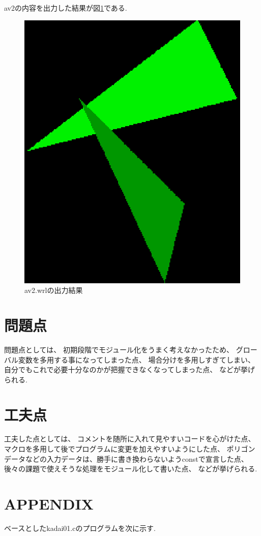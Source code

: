 \documentclass[a4j,dvipdfmx]{jsarticle}
\begin{document}
av2の内容を出力した結果が図\ref{fig:av2}である.
\begin{figure}[htbp]
  \begin{center}
        \includegraphics[clip,scale=0.7]{images/av2.eps}
        \caption{av2.wrlの出力結果}
        \label{fig:av2}
  \end{center}
\end{figure}



\section{問題点}
問題点としては、
初期段階でモジュール化をうまく考えなかったため、
グローバル変数を多用する事になってしまった点、
場合分けを多用しすぎてしまい、自分でもこれで必要十分なのかが把握できなくなってしまった点、
などが挙げられる.

\section{工夫点}
工夫した点としては、
コメントを随所に入れて見やすいコードを心がけた点、
マクロを多用して後でプログラムに変更を加えやすいようにした点、
ポリゴンデータなどの入力データは、勝手に書き換わらないようconstで宣言した点、
後々の課題で使えそうな処理をモジュール化して書いた点、
などが挙げられる.




\section{APPENDIX}
ベースとしたkadai01.cのプログラムを次に示す.

\end{document}
